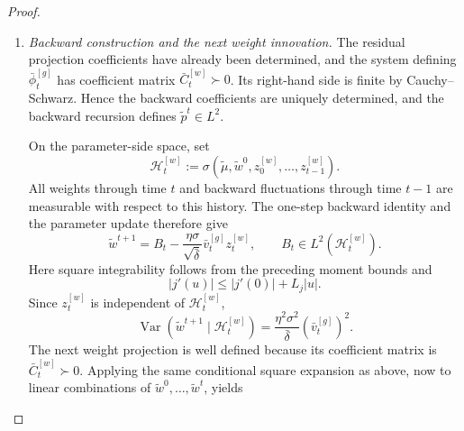 \begin{proof}
\begin{enumerate}[wide]
            Finally,
            $\bar\zeta^t=\tilde{\mathbb E}[\tilde g^t]$ and
            $\bar\chi^t=\tilde{\mathbb E}[\tilde Y\tilde g^t]$
            are finite, and so is
            $\bar b^{t+1}=\bar b^t-\eta\bar\zeta^t$.
        
            \item \emph{Backward construction and the next weight innovation.}
            The residual projection coefficients have already been
            determined, and the system defining $\bar\phi_t^{[g]}$
            has coefficient matrix $\bar C_t^{[w]}\succ0$.
            Its right-hand side is finite by Cauchy--Schwarz.
            Hence the backward coefficients are uniquely determined,
            and the backward recursion defines $\tilde p^t\in L^2$.
        
            On the parameter-side space, set
            \[
                \mathcal H_t^{[w]}
                :=
                \sigma(
                    \tilde\mu,\tilde w^0,
                    z_0^{[w]},\ldots,z_{t-1}^{[w]}
                ).
            \]
            All weights through time $t$ and backward fluctuations
            through time $t-1$ are measurable with respect to this
            history.
            The one-step backward identity and the parameter update
            therefore give
            \begin{equation}
                \tilde w^{t+1}
                =
                B_t
                -
                \frac{\eta\sigma}{\sqrt{\bar\delta}}
                \bar v_t^{[g]}z_t^{[w]},
                \qquad
                B_t\in L^2(\mathcal H_t^{[w]}).
                \label{eq:mf-proof-weight-fresh-noise}
            \end{equation}
            Here square integrability follows from the preceding
            moment bounds and
            \[
                |j'(u)|\leq |j'(0)|+L_j|u|.
            \]
            Since $z_t^{[w]}$ is independent of $\mathcal H_t^{[w]}$,
            \[
                \operatorname{Var}
                (\tilde w^{t+1}\mid\mathcal H_t^{[w]})
                =
                \frac{\eta^2\sigma^2}{\bar\delta}
                (\bar v_t^{[g]})^2.
            \]
            The next weight projection is well defined because its
            coefficient matrix is $\bar C_t^{[w]}\succ0$.
            Applying the same conditional square expansion as above,
            now to linear combinations of
            $\tilde w^0,\ldots,\tilde w^t$, yields
            \begin{equation}

\end{equation}
\end{enumerate}
\end{proof}

